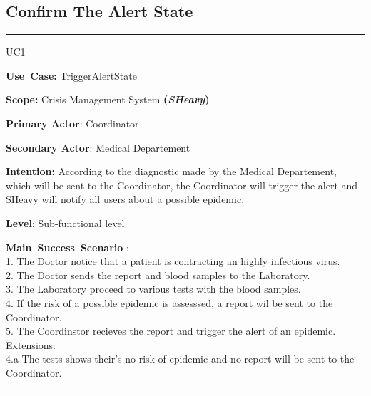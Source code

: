 \subsection{Confirm The Alert State}
\vspace{0.5cm}
\hrule
\vspace{0.5cm}
\begin{lyxlist}{UC1}
\small{
\item [\textbf{Use~Case:}] TriggerAlertState
\item [\textbf{Scope:}] Crisis Management System \textbf{(\emph{SHeavy})}
\item [\textbf{Primary Actor}:] Coordinator
\item [\textbf{Secondary Actor}:] Medical Departement
\item [\textbf{Intention:}] According to the diagnostic made by the Medical
Departement, which will be sent to the Coordinator, the Coordinator will trigger
the alert and SHeavy will notify all users about a possible epidemic.
\item [\textbf{Level}:]Sub-functional level
\item [\textbf{Main~Success~Scenario}]:\\
1. The Doctor notice that a patient is contracting an highly infectious virus.\\
2. The Doctor sends the report and blood samples to the Laboratory.\\
3. The Laboratory proceed to various tests with the blood samples.\\
4. If the risk of a possible epidemic is assesssed, a report wil be sent to
the Coordinator.\\
5. The Coordinstor recieves the report and trigger the alert of an epidemic.\\
Extensions:\\
4.a The tests shows their's no risk of epidemic and no report will be sent to
the Coordinator.\\
}
\end{lyxlist}
\hrule 
\vspace{0.5cm} 

